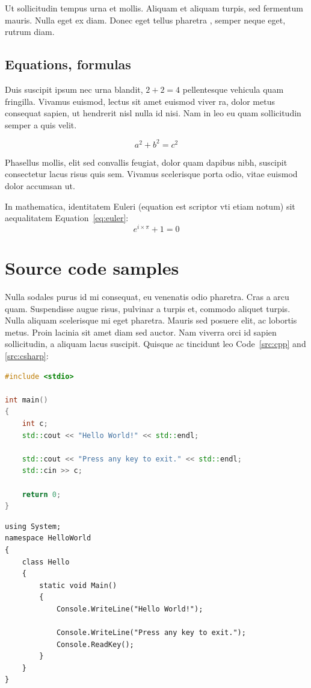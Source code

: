Ut sollicitudin tempus urna et mollis. Aliquam et aliquam turpis, sed fermentum mauris. Nulla eget ex diam. Donec eget tellus pharetra
, semper neque eget, rutrum diam.

\subsection{Equations, formulas}

Duis suscipit ipsum nec urna blandit, $2 + 2 = 4$ pellentesque vehicula quam fringilla. Vivamus euismod, lectus sit amet euismod viver
ra, dolor metus consequat sapien, ut hendrerit nisl nulla id nisi. Nam in leo eu quam sollicitudin semper a quis velit.

$$a^2 + b^2 = c^2$$

Phasellus mollis, elit sed convallis feugiat, dolor quam dapibus nibh, suscipit consectetur lacus risus quis sem. Vivamus scelerisque 
porta odio, vitae euismod dolor accumsan ut.

In mathematica, identitatem Euleri (equation est scriptor vti etiam notum) sit aequalitatem Equation~\ref{eq:euler}:
\begin{equation}\label{eq:euler}
e^{i \times \pi} + 1 = 0
\end{equation}


\section{Source code samples}

Nulla sodales purus id mi consequat, eu venenatis odio pharetra. Cras a arcu quam. Suspendisse augue risus, pulvinar a turpis et, 
commodo aliquet turpis. Nulla aliquam scelerisque mi eget pharetra. Mauris sed posuere elit, ac lobortis metus. Proin lacinia sit
amet diam sed auctor. Nam viverra orci id sapien sollicitudin, a aliquam lacus suscipit. Quisque ac tincidunt leo Code~\ref{src:cpp}
and \ref{src:csharp}:

\begin{lstlisting}[language={C++}]
#include <stdio>

int main() 
{
	int c;
	std::cout << "Hello World!" << std::endl;

	std::cout << "Press any key to exit." << std::endl;
	std::cin >> c;
	
	return 0;
}
\end{lstlisting}

\begin{lstlisting}[language={[Sharp]C}]
using System;
namespace HelloWorld
{
	class Hello 
	{
		static void Main() 
		{
			Console.WriteLine("Hello World!");
			
			Console.WriteLine("Press any key to exit.");
			Console.ReadKey();
		}
	}
}
\end{lstlisting}

